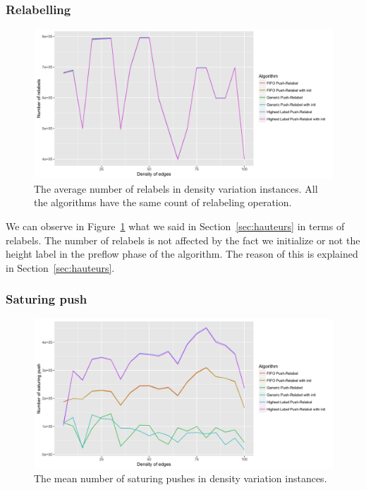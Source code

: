 \subsubsection{Relabelling}
\begin{figure}[H]
\begin{center}
\includegraphics[scale=0.15]{images/meanrelabels.png}
\caption{The average number of relabels in density variation instances. All the algorithms have the same count of relabeling operation.}
\label{fig:mean_relabel}
\end{center}
\end{figure}

We can observe in Figure~\ref{fig:mean_relabel} what we said in Section~\ref{sec:hauteurs} in terms of relabels. The number of relabels is not affected by the fact we initialize or not the height label in the preflow phase of the algorithm. The reason of this is explained in Section~\ref{sec:hauteurs}.

\subsubsection{Saturing push}
\begin{figure}[H]
\begin{center}
\includegraphics[scale=0.125]{images/meansaturingpushes.png}
\caption{The mean number of saturing pushes in density variation instances.}
\label{fig:mean_sat}
\end{center}
\end{figure}

